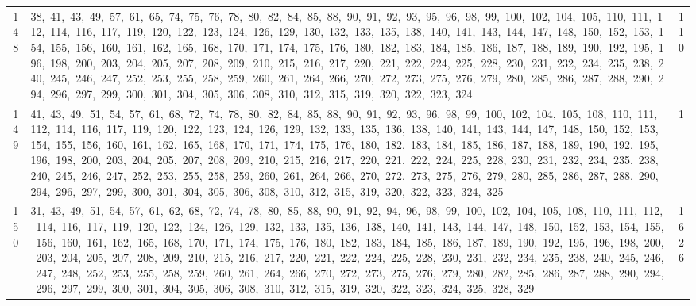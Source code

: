 \begin{longtable}{c|p{}|r}
148 & 38,\ 41,\ 43,\ 49,\ 57,\ 61,\ 65,\ 74,\ 75,\ 76,\ 78,\ 80,\ 82,\ 84,\ 85,\ 88,\ 90,\ 91,\ 92,\ 93,\ 95,\ 96,\ 98,\ 99,\ 100,\ 102,\ 104,\ 105,\ 110,\ 111,\ 112,\ 114,\ 116,\ 117,\ 119,\ 120,\ 122,\ 123,\ 124,\ 126,\ 129,\ 130,\ 132,\ 133,\ 135,\ 138,\ 140,\ 141,\ 143,\ 144,\ 147,\ 148,\ 150,\ 152,\ 153,\ 154,\ 155,\ 156,\ 160,\ 161,\ 162,\ 165,\ 168,\ 170,\ 171,\ 174,\ 175,\ 176,\ 180,\ 182,\ 183,\ 184,\ 185,\ 186,\ 187,\ 188,\ 189,\ 190,\ 192,\ 195,\ 196,\ 198,\ 200,\ 203,\ 204,\ 205,\ 207,\ 208,\ 209,\ 210,\ 215,\ 216,\ 217,\ 220,\ 221,\ 222,\ 224,\ 225,\ 228,\ 230,\ 231,\ 232,\ 234,\ 235,\ 238,\ 240,\ 245,\ 246,\ 247,\ 252,\ 253,\ 255,\ 258,\ 259,\ 260,\ 261,\ 264,\ 266,\ 270,\ 272,\ 273,\ 275,\ 276,\ 279,\ 280,\ 285,\ 286,\ 287,\ 288,\ 290,\ 294,\ 296,\ 297,\ 299,\ 300,\ 301,\ 304,\ 305,\ 306,\ 308,\ 310,\ 312,\ 315,\ 319,\ 320,\ 322,\ 323,\ 324 & 110 \\
149 & 41,\ 43,\ 49,\ 51,\ 54,\ 57,\ 61,\ 68,\ 72,\ 74,\ 78,\ 80,\ 82,\ 84,\ 85,\ 88,\ 90,\ 91,\ 92,\ 93,\ 96,\ 98,\ 99,\ 100,\ 102,\ 104,\ 105,\ 108,\ 110,\ 111,\ 112,\ 114,\ 116,\ 117,\ 119,\ 120,\ 122,\ 123,\ 124,\ 126,\ 129,\ 132,\ 133,\ 135,\ 136,\ 138,\ 140,\ 141,\ 143,\ 144,\ 147,\ 148,\ 150,\ 152,\ 153,\ 154,\ 155,\ 156,\ 160,\ 161,\ 162,\ 165,\ 168,\ 170,\ 171,\ 174,\ 175,\ 176,\ 180,\ 182,\ 183,\ 184,\ 185,\ 186,\ 187,\ 188,\ 189,\ 190,\ 192,\ 195,\ 196,\ 198,\ 200,\ 203,\ 204,\ 205,\ 207,\ 208,\ 209,\ 210,\ 215,\ 216,\ 217,\ 220,\ 221,\ 222,\ 224,\ 225,\ 228,\ 230,\ 231,\ 232,\ 234,\ 235,\ 238,\ 240,\ 245,\ 246,\ 247,\ 252,\ 253,\ 255,\ 258,\ 259,\ 260,\ 261,\ 264,\ 266,\ 270,\ 272,\ 273,\ 275,\ 276,\ 279,\ 280,\ 285,\ 286,\ 287,\ 288,\ 290,\ 294,\ 296,\ 297,\ 299,\ 300,\ 301,\ 304,\ 305,\ 306,\ 308,\ 310,\ 312,\ 315,\ 319,\ 320,\ 322,\ 323,\ 324,\ 325 & 1 \\
150 & 31,\ 43,\ 49,\ 51,\ 54,\ 57,\ 61,\ 62,\ 68,\ 72,\ 74,\ 78,\ 80,\ 85,\ 88,\ 90,\ 91,\ 92,\ 94,\ 96,\ 98,\ 99,\ 100,\ 102,\ 104,\ 105,\ 108,\ 110,\ 111,\ 112,\ 114,\ 116,\ 117,\ 119,\ 120,\ 122,\ 124,\ 126,\ 129,\ 132,\ 133,\ 135,\ 136,\ 138,\ 140,\ 141,\ 143,\ 144,\ 147,\ 148,\ 150,\ 152,\ 153,\ 154,\ 155,\ 156,\ 160,\ 161,\ 162,\ 165,\ 168,\ 170,\ 171,\ 174,\ 175,\ 176,\ 180,\ 182,\ 183,\ 184,\ 185,\ 186,\ 187,\ 189,\ 190,\ 192,\ 195,\ 196,\ 198,\ 200,\ 203,\ 204,\ 205,\ 207,\ 208,\ 209,\ 210,\ 215,\ 216,\ 217,\ 220,\ 221,\ 222,\ 224,\ 225,\ 228,\ 230,\ 231,\ 232,\ 234,\ 235,\ 238,\ 240,\ 245,\ 246,\ 247,\ 248,\ 252,\ 253,\ 255,\ 258,\ 259,\ 260,\ 261,\ 264,\ 266,\ 270,\ 272,\ 273,\ 275,\ 276,\ 279,\ 280,\ 282,\ 285,\ 286,\ 287,\ 288,\ 290,\ 294,\ 296,\ 297,\ 299,\ 300,\ 301,\ 304,\ 305,\ 306,\ 308,\ 310,\ 312,\ 315,\ 319,\ 320,\ 322,\ 323,\ 324,\ 325,\ 328,\ 329 & 1626 \\

\end{longtable}

